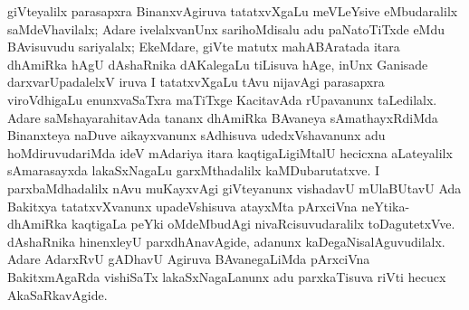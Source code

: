 giVteyalilx parasapxra BinanxvAgiruva tatatxvXgaLu meVLeYsive eMbudaralilx saMdeVhavilalx; Adare ivelalxvanUnx sarihoMdisalu adu paNatoTiTxde eMdu BAvisuvudu sariyalalx; EkeMdare, giVte matutx mahABAratada itara dhAmiRka hAgU dAshaRnika dAKalegaLu tiLisuva hAge, inUnx Ganisade darxvarUpadalelxV iruva I tatatxvXgaLu tAvu nijavAgi parasapxra viroVdhigaLu enunxvaSaTxra maTiTxge KacitavAda rUpavanunx taLedilalx. Adare saMshayarahitavAda tananx dhAmiRka BAvaneya sAmathayxRdiMda Binanxteya naDuve aikayxvanunx sAdhisuva udedxVshavanunx adu hoMdiruvudariMda ideV mAdariya itara kaqtigaLigiMtalU hecicxna aLateyalilx sAmarasayxda lakaSxNagaLu garxMthadalilx kaMDubarutatxve. I parxbaMdhadalilx nAvu muKayxvAgi giVteyanunx vishadavU mUlaBUtavU Ada Bakitxya tatatxvXvanunx upadeVshisuva atayxMta pArxciVna neYtika-dhAmiRka kaqtigaLa peYki oMdeMbudAgi nivaRcisuvudaralilx toDagutetxVve. dAshaRnika hinenxleyU parxdhAnavAgide, adanunx kaDegaNisalAguvudilalx. Adare AdarxRvU gADhavU Agiruva BAvanegaLiMda pArxciVna BakitxmAgaRda vishiSaTx lakaSxNagaLanunx adu parxkaTisuva riVti hecucx AkaSaRkavAgide.

